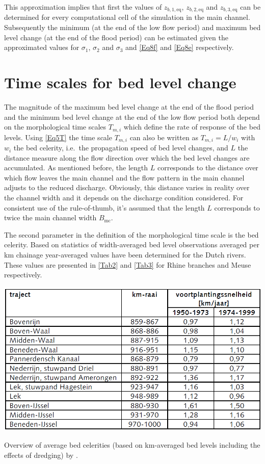This approximation implies that first the values of $z_{b,1,\text{eq}}$, $z_{b,2,\text{eq}}$ and $z_{b,3,\text{eq}}$ can be determined for every computational cell of the simulation in the main channel.
Subsequently the minimum (at the end of the low flow period) and maximum bed level change (at the end of the flood period) can be estimated given the approximated values for $\sigma_1$, $\sigma_2$ and $\sigma_3$ and \autoref{Eq8f} and \autoref{Eq8e} respectively.

\section{Time scales for bed level change}

The magnitude of the maximum bed level change at the end of the flood period and the minimum bed level change at the end of the low flow period both depend on the morphological time scales $T_{m,i}$  which define the rate of response of the bed levels.
Using \autoref{Eq5T} the time scale $T_{m,i}$ can also be written as $T_{m,i} = L/w_i$ with $w_i$ the bed celerity, i.e.~the propagation speed of bed level changes, and $L$ the distance measure along the flow direction over which the bed level changes are accumulated.
As mentioned before, the length $L$ corresponds to the distance over which flow leaves the main channel and the flow pattern in the main channel adjusts to the reduced discharge.
Obviously, this distance varies in reality over the channel width and it depends on the discharge condition considered.
For consistent use of the rule-of-thumb, it's assumed that the length $L$ corresponds to twice the main channel width $B_\text{mc}$.

The second parameter in the definition of the morphological time scale is the bed celerity.
Based on statistics of width-averaged bed level observations averaged per km chainage year-averaged values have been determined \citep{RIZA2005} for the Dutch rivers.
These values are presented in \autoref{Tab2} and \autoref{Tab3} for Rhine branches and Meuse respectively.

\begin{table}
\includegraphics[width=\columnwidth]{figures/Tab2.png}
\caption{Overview of average bed celerities (based on km-averaged bed levels including the effects of dredging) by \citet{RIZA2005}.}
\label{Tab2Again}
\end{table}

